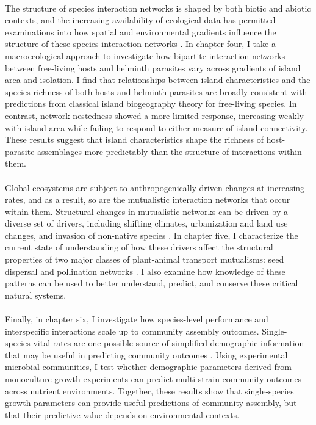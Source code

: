 \paragraph*{} The structure of species interaction networks is shaped by both biotic and abiotic contexts, and the increasing availability of ecological data has permitted examinations into how spatial and environmental gradients influence the structure of these species interaction networks \parencite{tylianakis2017}. In chapter four, I take a macroecological approach to investigate how bipartite interaction networks between free-living hosts and helminth parasites vary across gradients of island area and isolation. I find that relationships between island characteristics and the species richness of both hosts and helminth parasites are broadly consistent with predictions from classical island biogeography theory for free-living species. In contrast, network nestedness showed a more limited response, increasing weakly with island area while failing to respond to either measure of island connectivity. These results suggest that island characteristics shape the richness of host-parasite assemblages more predictably than the structure of interactions within them.

\paragraph*{} Global ecosystems are subject to anthropogenically driven changes at increasing rates, and as a result, so are the mutualistic interaction networks that occur within them. Structural changes in mutualistic networks can be driven by a diverse set of drivers, including shifting climates, urbanization and land use changes, and invasion of non-native species \parencite{traveset2014mutualistic, teixido2022anthropogenic, cruz2023mutualisms}. In chapter five, I characterize the current state of understanding of how these drivers affect the structural properties of two major classes of plant-animal transport mutualisms: seed dispersal and pollination networks \parencite{bronsteinmutualism1}. I also examine how knowledge of these patterns can be used to better understand, predict, and conserve these critical natural systems.

\paragraph*{} Finally, in chapter six, I investigate how species-level performance and interspecific interactions scale up to community assembly outcomes. Single-species vital rates are one possible source of simplified demographic information that may be useful in predicting community outcomes \parencite{ram2019predicting, nestor2023interactions}. Using experimental microbial communities, I test whether demographic parameters derived from monoculture growth experiments can predict multi-strain community outcomes across nutrient environments. Together, these results show that single-species growth parameters can provide useful predictions of community assembly, but that their predictive value depends on environmental contexts.

